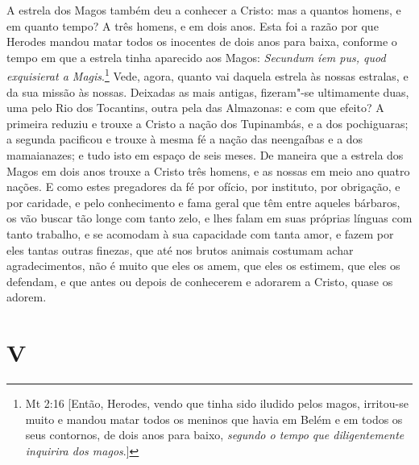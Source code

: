 A estrela dos Magos também deu a conhecer a Cristo: mas a quantos
homens, e em quanto tempo? A três homens, e em dois anos. Esta foi a
razão por que Herodes mandou matar todos os inocentes de dois anos para
baixa, conforme o tempo em que a estrela tinha aparecido aos Magos:
\emph{Secundum íem pus, quod exquisierat a Magis}.\footnote{Mt 2:16 [Então, Herodes, vendo que tinha sido iludido pelos magos, irritou-se muito e mandou
matar todos os meninos que havia em Belém e em todos os seus contornos, de dois anos para
baixo, \emph{segundo o tempo que diligentemente inquirira dos magos}.]}
Vede, agora, quanto vai daquela estrela às nossas estralas, e da sua
missão às nossas. Deixadas as mais antigas, fizeram"-se ultimamente duas,
uma pelo Rio dos Tocantins, outra pela das Almazonas: e com que efeito?
A primeira reduziu e trouxe a Cristo a nação dos Tupinambás, e a dos
pochiguaras; a segunda pacificou e trouxe à mesma fé a nação das
neengaíbas e a dos mamaianazes; e tudo isto em espaço de seis meses. De
maneira que a estrela dos Magos em dois anos trouxe a Cristo três
homens, e as nossas em meio ano quatro nações. E como estes pregadores
da fé por ofício, por instituto, por obrigação, e por caridade, e pelo
conhecimento e fama geral que têm entre aqueles bárbaros, os vão buscar
tão longe com tanto zelo, e lhes falam em suas próprias línguas com
tanto trabalho, e se acomodam à sua capacidade com tanta amor, e fazem
por eles tantas outras finezas, que até nos brutos animais costumam
achar agradecimentos, não é muito que eles os amem, que eles os estimem,
que eles os defendam, e que antes ou depois de conhecerem e adorarem a
Cristo, quase os adorem.

\section*{V}

